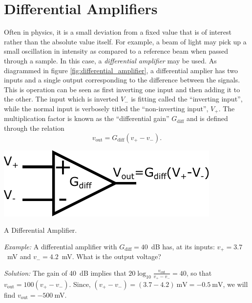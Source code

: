 \documentclass{tufte-book}
\begin{document}
\section{Differential Amplifiers}
\label{sec:diff_amps}
Often in physics, it is a small deviation from a fixed value that is of interest rather than the absolute value itself. For example, a beam of light may pick up a small oscillation in intensity as compared to a reference beam when passed through a sample. In this case, a \textit{differential amplifier} may be used. As diagrammed in figure \ref{fig:differential_amplifier}, a differential amplier has two inputs and a single output corresponding to the difference between the signals. This is operation can be seen as first inverting one input and then adding it to the other. The input which is inverted $V_-$ is fitting called the ``inverting input'', while the normal input is verbosely titled the ``non-inverting input'', $V_+$. The multiplication factor is known as the ``differential gain'' $G_\text{diff}$ and is defined through the relation
\begin{equation}
\label{eq:def_diff_amp}
v_\text{out} = G_\text{diff}\left(v_+-v_-\right).
\end{equation}


\begin{marginfigure}%
  \includegraphics[width=\linewidth]{differential_amplifier}
  \caption{A Differential Amplifier.}
  \label{fig:differential_amplifier}
\end{marginfigure}


\textit{Example:} A differential amplifier with $G_\text{diff} = 40$~dB has, at its inputs: $v_+ = 3.7$~mV and $v_- = 4.2$~mV. What is the output voltage?

\textit{Solution:} The gain of 40~dB implies that $20\log_{10}\frac{v_\text{out}}{v_+-v_-} = 40$, so that $v_\text{out} = 100\left(v_+-v_-\right)$. Since, $\left(v_+-v_-\right) = \left(3.7-4.2\right)~\text{mV} = -0.5~\text{mV}$, we will find $v_\text{out} = -500~$mV.
\end{document}
